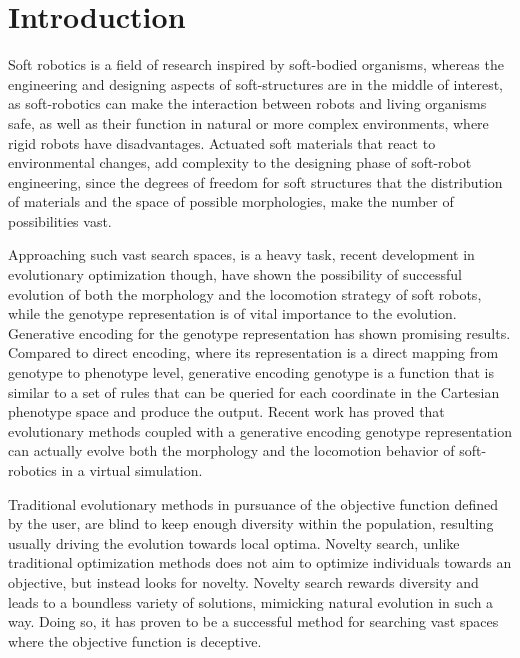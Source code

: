 
\chapter{Introduction} %

\label{Chapter1} %



Soft robotics is a field of research inspired by soft-bodied organisms, whereas the engineering and designing aspects of soft-structures are in the middle of interest, as soft-robotics can make the interaction between robots and living organisms safe, as well as their function in natural or more complex environments, where rigid robots have disadvantages. Actuated soft materials that react to environmental changes, add complexity to the designing phase of soft-robot engineering, since the degrees of freedom for soft structures that the distribution of materials and the space of possible morphologies, make the number of possibilities vast. 

Approaching such vast search spaces, is a heavy task, recent development in evolutionary optimization though, have shown the possibility of successful evolution of both the morphology and the locomotion strategy of soft robots, while the genotype representation is of vital importance to the evolution. Generative encoding for the genotype representation has shown promising results. Compared to direct encoding, where its representation is a direct mapping from genotype to phenotype level, generative encoding genotype is a function that is similar to a set of rules that can be queried for each coordinate in the Cartesian phenotype space and produce the output. Recent work has proved that evolutionary methods coupled with a generative encoding genotype representation can actually evolve both the morphology and the locomotion behavior of soft-robotics in a virtual simulation.

Traditional evolutionary methods in pursuance of the objective function defined by the user, are blind to keep enough diversity within the population, resulting usually driving the evolution towards local optima. Novelty search, unlike traditional optimization methods does not aim to optimize individuals towards an objective, but instead looks for novelty. Novelty search rewards diversity and leads to a boundless variety of solutions, mimicking natural evolution in such a way. Doing so, it has proven to be a successful method for searching vast spaces where the objective function is deceptive.

